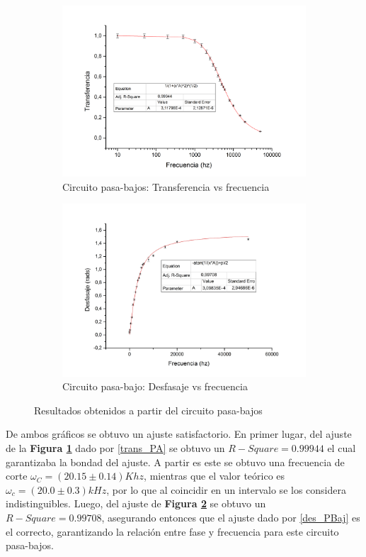 \documentclass[11pt,a4paper]{article}
\begin{document}
\begin{figure}[h]
\begin{subfigure}{0.5\textwidth}
\includegraphics[scale=0.34]{PB_TRANSFERENCIA}
  \caption{Circuito pasa-bajos: Transferencia vs frecuencia }
  \label{subfig:PB.a}
\end{subfigure}
\begin{subfigure}{0.5\textwidth}
\includegraphics[scale=0.34]{PB_DESFASAJE}
  \caption{Circuito pasa-bajo: Desfasaje vs frecuencia}
  \label{subfig:PB.b}
\end{subfigure}
  \caption{Resultados obtenidos a partir del circuito pasa-bajos}
  \label{fig:PB}
\end{figure}


De ambos gráficos se obtuvo un ajuste satisfactorio. En primer lugar, del ajuste de la \textbf{Figura \ref{subfig:PB.a}} dado por \eqref{trans_PA} se obtuvo un $R-Square = 0.99944$ el cual garantizaba la bondad del ajuste. A partir es este se obtuvo una frecuencia de corte $\omega_C = (20.15 \pm 0.14) Khz$, mientras que el valor teórico es $\omega_c = (20.0 \pm 0.3)kHz$, por lo que al coincidir en un intervalo se los considera indistinguibles. Luego, del ajuste de \textbf{Figura \ref{subfig:PB.b}} se obtuvo un $R-Square=0.99708$, asegurando entonces que el ajuste dado por \eqref{des_PBaj} es el correcto, garantizando la relación entre fase y frecuencia para este circuito pasa-bajos.
\end{document}
